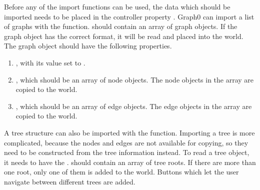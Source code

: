 Before any of the import functions can be used, the data which should be imported needs to be placed in the controller property .
Graph0 can import a list of graphs with the  function.  should contain an array of graph objects. If the graph object has the correct format, it will be read and placed into the world. The graph object should have the following properties.
\begin{enumerate}
    \item {}, with its value set to .
    \item {}, which should be an array of node objects. The node objects in the array are copied to the world.
    \item {}, which should be an array of edge objects. The edge objects in the array are copied to the world.
\end{enumerate}
A tree structure can also be imported with the  function. Importing a tree is more complicated, because the nodes and edges are not available for copying, so they need to be constructed from the tree information instead. To read a tree object, it needs to have the .  should contain an array of tree roots. If there are more than one root, only one of them is added to the world. Buttons which let the user navigate between different trees are added.